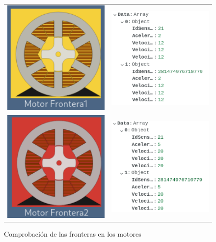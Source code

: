 \documentclass[12pt]{article}
\begin{document}
\begin{refsegment}
    \begin{figure}[H]
        \centering
        \caption{Comprobación de las fronteras en los motores}
        \begin{tabular}{m{6cm}m{6cm}}
            \includegraphics[width=6cm]{comprobacion_resultados/finales/f1.png}&
            \includegraphics[width=6cm]{comprobacion_resultados/finales/f1mongo.png}\\
            \includegraphics[width=6cm]{comprobacion_resultados/finales/f2.png}&
            \includegraphics[width=6cm]{comprobacion_resultados/finales/f2mongo.png}
        \end{tabular}
        \label{img:FronterasEnLosMotores}
    \end{figure}


\end{refsegment}
\end{document}
